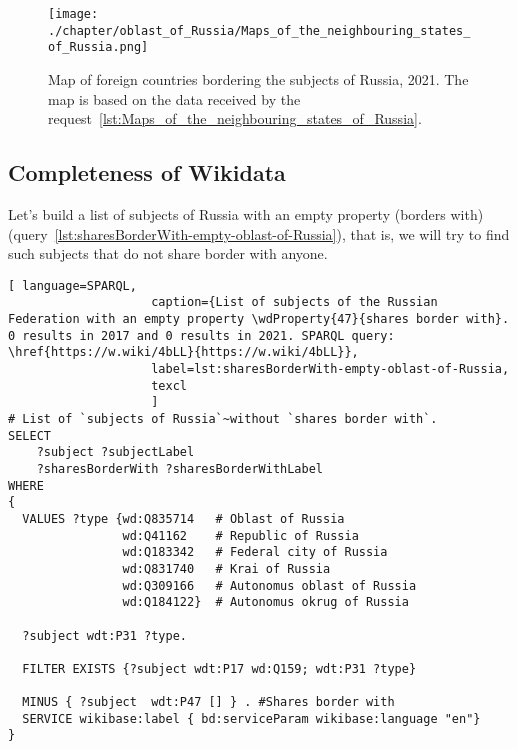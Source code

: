 \begin{figure*}[h]
	\texttt{[image: ./chapter/oblast\_of\_Russia/Maps\_of\_the\_neighbouring\_states\_of\_Russia.png]}
	\caption[Map of foreign countries bordering the subjects of Russia, 2021.]{Map of foreign countries bordering the subjects of Russia, 2021. The map is based on the data received by the request~\protect\ref{lst:Maps_of_the_neighbouring_states_of_Russia}.}%
      \label{fig:MapsoftheneighbouringstatesofRussia}%
\end{figure*}

\newpage
\subsection{Completeness of Wikidata}

Let's build a list of subjects of Russia with an empty property  (borders with) (query~\ref{lst:sharesBorderWith-empty-oblast-of-Russia}), that is, we will try to find such subjects that do not share border with anyone.

\label{question:q_subjects_of_Russia_2}

\lstset{numbers=left, firstnumber=1, frame=single}
\begin{lstlisting}[ language=SPARQL, 
                    caption={List of subjects of the Russian Federation with an empty property \wdProperty{47}{shares border with}. 0 results in 2017 and 0 results in 2021. SPARQL query: \href{https://w.wiki/4bLL}{https://w.wiki/4bLL}},
                    label=lst:sharesBorderWith-empty-oblast-of-Russia,
                    texcl 
                    ]
# List of `subjects of Russia`~without `shares border with`. 
SELECT 
    ?subject ?subjectLabel 
    ?sharesBorderWith ?sharesBorderWithLabel
WHERE
{
  VALUES ?type {wd:Q835714   # Oblast of Russia
                wd:Q41162    # Republic of Russia
                wd:Q183342   # Federal city of Russia
                wd:Q831740   # Krai of Russia
                wd:Q309166   # Autonomus oblast of Russia
                wd:Q184122}  # Autonomus okrug of Russia
  
  ?subject wdt:P31 ?type.
  
  FILTER EXISTS {?subject wdt:P17 wd:Q159; wdt:P31 ?type}
  
  MINUS { ?subject  wdt:P47 [] } . #Shares border with 
  SERVICE wikibase:label { bd:serviceParam wikibase:language "en"}
}
\end{lstlisting}%

